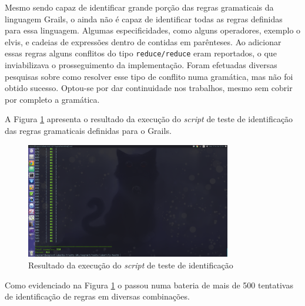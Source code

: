 Mesmo sendo capaz de identificar grande porção das regras gramaticais da
linguagem \textsf{Grails}, o \parser ainda não é capaz de identificar todas
as regras definidas para essa linguagem. Algumas especificidades, como alguns
operadores, exemplo o \textsf{elvis}, e cadeias de expressões dentro de
contidas em parênteses. Ao adicionar essas regras alguns conflitos do tipo
\lstinline|reduce/reduce| eram reportados, o que inviabilizava o
prosseguimento da implementação. Foram efetuadas diversas pesquisas
sobre como resolver esse tipo de conflito numa gramática, mas não foi
obtido sucesso. Optou-se por dar continuidade nos trabalhos, mesmo sem
cobrir por completo a gramática.

A Figura \ref{identification-test} apresenta o resultado da execução do
\textit{script} de teste de identificação das regras gramaticais definidas
para o \textsf{Grails}.
\begin{figure}[h]
  \centering
    \includegraphics[width=0.8\textwidth]{figuras/identification-test.png}
    \caption{Resultado da execução do \textit{script} de teste de identificação}
    \label{identification-test}
\end{figure}

Como evidenciado na Figura \ref{identification-test} o \parser passou numa
bateria de mais de 500 tentativas de identificação de regras em diversas
combinações.